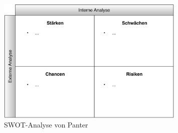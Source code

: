 \begin{figure}[htbp]
\begin{center}
\includegraphics[width=0.8\textwidth,angle=0]{./bilder/analyse/marktanalyse/swot_analyse.pdf}
\caption{SWOT-Analyse von Panter}
\label{pic:swot_analyse_panter}
\end{center}
\end{figure}